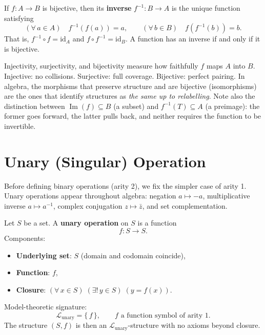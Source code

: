 \begin{definition}
\label{def:formal-model-theoretic-structures-l154}
  If $f : A \to B$ is bijective, then its \textbf{inverse}
  $f^{-1} : B \to A$ is the unique function satisfying
  \[
    (\forall\, a \in A)\quad f^{-1}(f(a)) = a,
    \qquad
    (\forall\, b \in B)\quad f(f^{-1}(b)) = b.
  \]
  That is, $f^{-1} \circ f = \mathrm{id}_A$ and
  $f \circ f^{-1} = \mathrm{id}_B$.
  A function has an inverse if and only if it is bijective.
\end{definition}

\begin{remark}
  Injectivity, surjectivity, and bijectivity measure how faithfully
  $f$ maps $A$ into $B$.  Injective: no collisions.  Surjective: full
  coverage.  Bijective: perfect pairing.  In algebra, the morphisms that
  preserve structure and are bijective (isomorphisms) are the ones that
  identify structures as \emph{the same up to relabelling}.
  Note also the distinction between $\operatorname{Im}(f) \subseteq B$
  (a subset) and $f^{-1}(T) \subseteq A$ (a preimage): the former goes
  forward, the latter pulls back, and neither requires the function to be
  invertible.
\end{remark}

\medskip

\section*{Unary (Singular) Operation}

\noindent
Before defining binary operations (arity 2), we fix the simpler case of
arity 1.  Unary operations appear throughout algebra: negation $a \mapsto -a$,
multiplicative inverse $a \mapsto a^{-1}$, complex conjugation
$z \mapsto \bar{z}$, and set complementation.

\begin{definition}
\label{def:formal-model-theoretic-structures-l192}
  Let $S$ be a set. A \textbf{unary operation} on $S$ is a function
  \[
    f : S \to S.
  \]
  Components:
  \begin{itemize}
    \item \textbf{Underlying set}: $S$ (domain and codomain coincide),
    \item \textbf{Function}: $f$,
    \item \textbf{Closure}: $(\forall\, x \in S)\;(\exists!\, y \in S)\;(y = f(x))$.
  \end{itemize}
  Model-theoretic signature:
  \[
    \mathcal{L}_{\mathrm{unary}} = \{\,f\,\},
    \qquad f \text{ a function symbol of arity } 1.
  \]
  The structure $(S, f)$ is then an $\mathcal{L}_{\mathrm{unary}}$-structure
  with no axioms beyond closure.
\end{definition}

